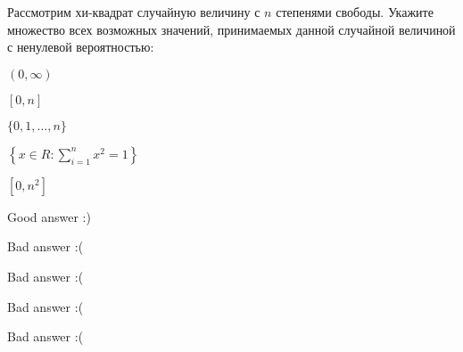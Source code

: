 
\begin{question}
Рассмотрим хи-квадрат случайную величину с \(n\) степенями свободы.
Укажите множество всех возможных значений, принимаемых данной случайной
величиной с ненулевой вероятностью:
\begin{answerlist}
  \item \((0,\infty )\)
  \item \([0,n]\)
  \item \(\{0,1,\ldots,n\}\)
  \item \(\left\{x\in R:\sum\limits_{i=1}^{n}{x_{{}}^{2}}=1\right\}\)
  \item \([0,n^2]\)
\end{answerlist}
\end{question}

\begin{solution}
\begin{answerlist}
  \item Good answer :)
  \item Bad answer :(
  \item Bad answer :(
  \item Bad answer :(
  \item Bad answer :(
\end{answerlist}
\end{solution}

